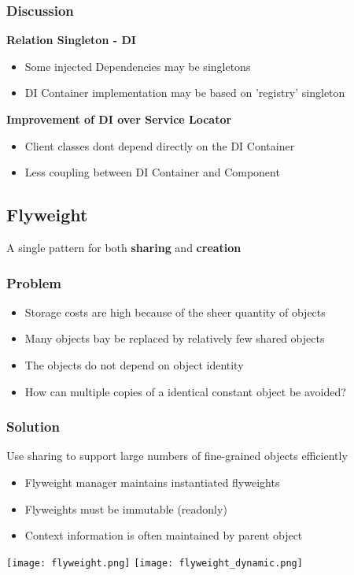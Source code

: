 \subsubsection{Discussion}
\textbf{Relation Singleton - DI}
\begin{itemize}
    \item Some injected Dependencies may be singletons
    \item DI Container implementation may be based on 'registry' singleton
\end{itemize}
\textbf{Improvement of DI over Service Locator}
\begin{itemize}
    \item Client classes dont depend directly on the DI Container
    \item Less coupling between DI Container and Component
\end{itemize}

\subsection{Flyweight}
A single pattern for both \textbf{sharing} and \textbf{creation}
\subsubsection{Problem}
\begin{itemize}
    \item Storage costs are high because of the sheer quantity of objects
    \item Many objects bay be replaced by relatively few shared objects
    \item The objects do not depend on object identity
    \item How can multiple copies of a identical constant object be avoided?
\end{itemize}
\subsubsection{Solution}
Use sharing to support large numbers of fine-grained objects efficiently
\begin{itemize}
    \item Flyweight manager maintains instantiated flyweights
    \item Flyweights must be immutable (readonly)
    \item Context information is often maintained by parent object
\end{itemize}
\texttt{[image: flyweight.png]}
\texttt{[image: flyweight\_dynamic.png]}
